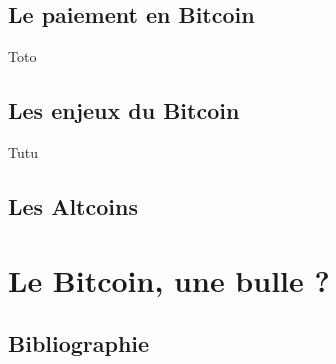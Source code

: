 \documentclass{bredele} %
\begin{document}
    \chapter[Le paiement en Bitcoin]{Le paiement en Bitcoin}
    Toto
    \chapter[Les enjeux du Bitcoin]{Les enjeux du Bitcoin}
    Tutu
    \chapter[Les Altcoins]{Les Altcoins}

    \part[Le Bictoin, une bulle ?]{Le Bitcoin, une bulle ?}


    \clearemptydoublepage
    \backmatter

    \clearemptydoublepage
    \chapter*{Bibliographie}


    \nocite{*} %
    \printbibliography[heading=primary,keyword=primary]
    \newpage
    \nocite{*}
    \printbibliography[heading=secondary,keyword=secondary]

    \newpage
    \clearemptydoublepage
\end{document}
